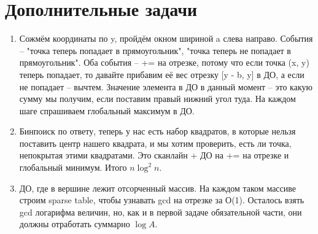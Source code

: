 \documentclass[12pt]{article}
\begin{document}
\section{Дополнительные задачи}

\begin{enumerate}
	\setlength{\parskip}{0pt} 
	\setlength{\itemsep}{0pt} 
	\item Сожмём координаты по y, пройдём окном шириной a слева направо. События -- "точка теперь попадает в прямоугольник", "точка теперь не попадает в прямоугольник". 
    Оба события -- += на отрезке, потому что если точка (x, y) теперь попадает, то давайте прибавим её вес отрезку [y - b, y] в ДО, а если не попадает -- вычтем. Значение элемента в ДО 
    в данный момент -- это какую сумму мы получим, если поставим правый нижний угол туда. На каждом шаге спрашиваем глобальный максимум в ДО. \\
    \item Бинпоиск по ответу, теперь у нас есть набор квадратов, в которые нельзя поставить центр нашего квадрата, и мы хотим проверить, есть ли точка, непокрытая этими квадратами. 
    Это сканлайн + ДО на += на отрезке и глобальный минимум. Итого $n \log^2 n$. \\
    \item ДО, где в вершине лежит отсорченный массив. На каждом таком массиве строим sparse table, чтобы узнавать gcd на отрезке за О(1). Осталось взять gcd логарифма величин, 
    но, как и в первой задаче обязательной части, они должны отработать суммарно $\log A$. \\
\end{enumerate}
\end{document}
